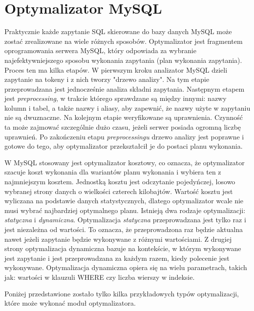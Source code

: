 \section{Optymalizator MySQL}

Praktycznie każde zapytanie SQL skierowane do bazy danych MySQL może zostać zrealizowane na wiele różnych sposobów. Optymalizator jest fragmentem oprogramowania serwera MySQL, który odpowiada za wybranie najefektywniejszego sposobu wykonania zapytania (plan wykonania zapytania). 
Proces ten ma kilka etapów. W pierwszym kroku analizator MySQL dzieli zapytanie na tokeny i z nich tworzy "drzewo analizy". Na tym etapie przeprowadzana jest jednocześnie analiza składni zapytania. Następnym etapem jest \textit{preprocessing}, w trakcie którego sprawdzane są między innymi: nazwy kolumn i tabel, a także nazwy i aliasy, aby zapewnić, że nazwy użyte w zapytaniu nie są dwuznaczne. Na kolejnym etapie weryfikowane są uprawnienia. Czynność ta może zajmować szczególnie dużo czasu, jeżeli serwer posiada ogromną liczbę uprawnień. Po zakończeniu etapu \textit{preprocessingu} drzewo analizy jest poprawne i gotowe do tego, aby optymalizator przekształcił je do postaci planu wykonania. 


W MySQL stosowany jest optymalizator kosztowy, co oznacza, że optymalizator szacuje koszt wykonania dla wariantów planu wykonania i wybiera ten z najmniejszym kosztem. Jednostką kosztu jest odczytanie pojedyńczej, losowo wybranej strony danych o wielkości czterech kilobajtów. Wartość kosztu jest wyliczana na podstawie danych statystycznych, dlatego optymalizator wcale nie musi wybrać najbardziej optymalnego planu. Istnieją dwa rodzaje optymalizacji: \textit{statyczna} i \textit{dynamiczna}. Optymalizacja \textit{statyczna} przeprowadzana jest tylko raz i jest niezależna od wartości. To oznacza, że przeprowadzona raz będzie aktualna nawet jeżeli zapytanie będzie wykonywane z różnymi wartościami. Z drugiej strony optymalizacja dynamiczna bazuje na kontekście, w którym wykonywane jest zapytanie i jest przeprowadzana za każdym razem, kiedy polecenie jest wykonywane. Optymalizacja dynamiczna opiera się na wielu parametrach, takich jak: wartości w klauzuli WHERE czy liczba wierszy w indeksie.

Poniżej przedstawione zostało tylko kilka przykładowych typów optymalizacji, które może wykonać moduł optymalizatora.

